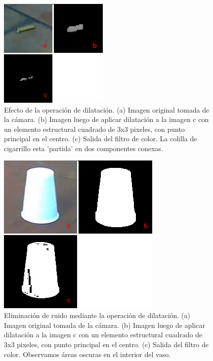 \begin{figure}[tpb]
\begin{center}
  \includegraphics[scale=0.8]{figuras/dilate1.png}
\end{center}
  \caption{\small Efecto de la operación de dilatación. (a)  Imagen original tomada de la cámara. (b) Imagen luego de aplicar dilatación a la imagen c con un elemento estructural cuadrado de 3x3 pixeles, con punto principal en el centro. (c) Salida del filtro de color. La colilla de cigarrillo esta 'partida' en dos componentes conexas. } 
  \label{fig:dilate}
\end{figure}

\begin{figure}[tpb]
\begin{center}

  \includegraphics[scale=0.6]{figuras/dilate-ruido.png}
\end{center}
  \caption{\small Eliminación de ruido mediante la operación de dilatación. (a) Imagen original tomada de la cámara. (b) Imagen luego de aplicar dilatación a la imagen c con un elemento estructural cuadrado de 3x3 pixeles, con punto principal en el centro. (c) Salida del filtro de color. Observamos áreas  oscuras en el interior del vaso. }
  \label{fig:dilate-ruido}
\end{figure}

